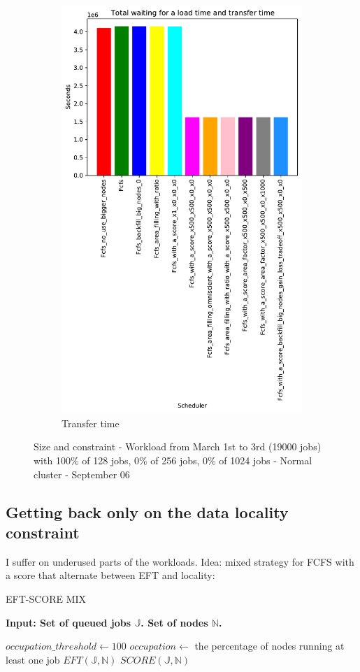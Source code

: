 \documentclass[a4paper]{article}
\newcommand{\jobset}{\ensuremath{\mathbb{J}}\xspace}
\newcommand{\nodeset}{\ensuremath{\mathbb{N}}\xspace}
\begin{document}
\begin{figure}[H]
\begin{subfigure}[b]{0.4\linewidth}\centering\includegraphics[width=0.7\linewidth]{MBSS/plot/Results_Size_And_Data_2022-03-01->2022-03-03_V10000_Total_waiting_for_a_load_time_and_transfer_time_450_128_32_256_4_1024.pdf}\caption{Transfer time}\label{45}\end{subfigure}
\caption{Size and constraint - Workload from March 1st to 3rd (19000 jobs) with 100\% of 128 jobs, 0\% of 256 jobs, 0\% of 1024 jobs - Normal cluster - September 06}\label{49}\end{figure}

\subsection{Getting back only on the data locality constraint}

I suffer on underused parts of the workloads. Idea: mixed strategy for FCFS with a score that alternate between EFT and locality:\\
\begin{algorithm}[htbp]
\caption{EFT-SCORE MIX}
\hspace*{\algorithmicindent} \textbf{Input: Set of queued jobs $\jobset$. Set of nodes $\nodeset$.} \\
\begin{algorithmic}[1]
\State $occupation\_threshold \gets 100$ 
\State $occupation \gets$ the percentage of nodes running at least one job
		\State $EFT(\jobset,\nodeset)$
	\Else
		\State $SCORE(\jobset,\nodeset)$
	\EndIf
\end{algorithmic}
\end{algorithm}
\end{document}
